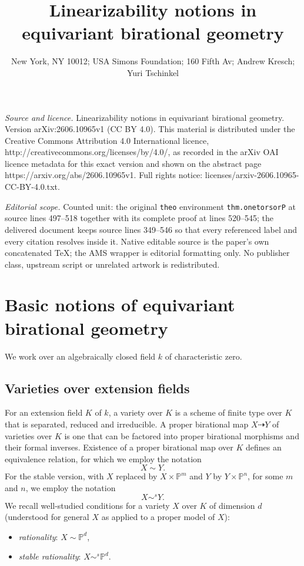 \documentclass[10pt,a4paper]{amsart}
\numberwithin{equation}{section}
\def\bP{{\mathbb P}}
\begin{document}
\title[Linearizability notions in equivariant birational geometry]{Linearizability notions in equivariant birational geometry}
\author{New York, NY 10012; USA Simons Foundation; 160 Fifth Av; Andrew Kresch; Yuri Tschinkel}
\date{}
\maketitle
\noindent\emph{Source and licence.} Linearizability notions in equivariant birational geometry. Version arXiv:2606.10965v1 (CC BY 4.0). This material is distributed under the Creative Commons Attribution 4.0 International licence, http://creativecommons.org/licenses/by/4.0/, as recorded in the arXiv OAI licence metadata for this exact version and shown on the abstract page https://arxiv.org/abs/2606.10965v1. Full rights notice: licenses/arxiv-2606.10965-CC-BY-4.0.txt.\par\smallskip
\noindent\textit{Editorial scope.} Counted unit: the original \texttt{theo} environment \texttt{thm.onetorsorP} at source lines 497--518 together with its complete proof at lines 520--545; the delivered document keeps source lines 349--546 so that every referenced label and every citation resolves inside it. Native editable source is the paper's own concatenated TeX; the AMS wrapper is editorial formatting only. No publisher class, upstream script or unrelated artwork is redistributed.
\section{Basic notions of equivariant birational geometry}
\label{sect:gen}
We work over an algebraically closed field $k$ of characteristic zero.

\subsection*{Varieties over extension fields}
For an extension field $K$ of $k$,
a variety over $K$ is a scheme of finite type over $K$ that is separated, reduced and irreducible.
A proper birational map $X\dashrightarrow Y$ of varieties over $K$ is one that can be factored into proper birational morphisms and their formal inverses.
Existence of a proper birational map over $K$ defines an equivalence relation, for which we employ the notation
\[ X\sim Y. \]
For the stable version, with $X$ replaced by $X\times \bP^m$ and $Y$ by $Y\times \bP^n$, for some $m$ and $n$, we employ the notation
\[ X\sim^s Y. \]
We recall well-studied conditions for a variety $X$ over $K$ of dimension $d$ (understood for general $X$ as applied to a proper model of $X$):
\begin{itemize}
\item {\em rationality}: 
$X\sim\bP^d$, 
\item {\em stable rationality}: $X\sim^s\bP^d$.
\end{itemize}
\end{document}
